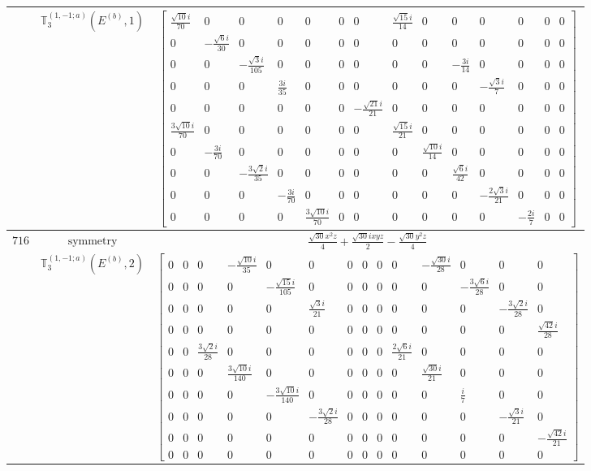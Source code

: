 \documentclass[fleqn,8pt,landscape]{jsarticle}
\begin{document}
\begin{longtable}{ccc}
$  $ & $ \mathbb{T}_{3}^{(1,-1;a)}(E^{(b)},1) $ & $ \begin{bmatrix} \frac{\sqrt{10} i}{70} & 0 & 0 & 0 & 0 & 0 & 0 & \frac{\sqrt{15} i}{14} & 0 & 0 & 0 & 0 & 0 & 0 \\ 0 & - \frac{\sqrt{6} i}{30} & 0 & 0 & 0 & 0 & 0 & 0 & 0 & 0 & 0 & 0 & 0 & 0 \\ 0 & 0 & - \frac{\sqrt{3} i}{105} & 0 & 0 & 0 & 0 & 0 & 0 & - \frac{3 i}{14} & 0 & 0 & 0 & 0 \\ 0 & 0 & 0 & \frac{3 i}{35} & 0 & 0 & 0 & 0 & 0 & 0 & - \frac{\sqrt{3} i}{7} & 0 & 0 & 0 \\ 0 & 0 & 0 & 0 & 0 & 0 & - \frac{\sqrt{21} i}{21} & 0 & 0 & 0 & 0 & 0 & 0 & 0 \\ \frac{3 \sqrt{10} i}{70} & 0 & 0 & 0 & 0 & 0 & 0 & \frac{\sqrt{15} i}{21} & 0 & 0 & 0 & 0 & 0 & 0 \\ 0 & - \frac{3 i}{70} & 0 & 0 & 0 & 0 & 0 & 0 & \frac{\sqrt{10} i}{14} & 0 & 0 & 0 & 0 & 0 \\ 0 & 0 & - \frac{3 \sqrt{2} i}{35} & 0 & 0 & 0 & 0 & 0 & 0 & \frac{\sqrt{6} i}{42} & 0 & 0 & 0 & 0 \\ 0 & 0 & 0 & - \frac{3 i}{70} & 0 & 0 & 0 & 0 & 0 & 0 & - \frac{2 \sqrt{3} i}{21} & 0 & 0 & 0 \\ 0 & 0 & 0 & 0 & \frac{3 \sqrt{10} i}{70} & 0 & 0 & 0 & 0 & 0 & 0 & - \frac{2 i}{7} & 0 & 0 \end{bmatrix} $ \\ \hline
$ 716 $ & $ \text{symmetry} $ & $ \frac{\sqrt{30} x^{2} z}{4} + \frac{\sqrt{30} i x y z}{2} - \frac{\sqrt{30} y^{2} z}{4} $ \\
$  $ & $ \mathbb{T}_{3}^{(1,-1;a)}(E^{(b)},2) $ & $ \begin{bmatrix} 0 & 0 & 0 & - \frac{\sqrt{10} i}{35} & 0 & 0 & 0 & 0 & 0 & 0 & - \frac{\sqrt{30} i}{28} & 0 & 0 & 0 \\ 0 & 0 & 0 & 0 & - \frac{\sqrt{15} i}{105} & 0 & 0 & 0 & 0 & 0 & 0 & - \frac{3 \sqrt{6} i}{28} & 0 & 0 \\ 0 & 0 & 0 & 0 & 0 & \frac{\sqrt{3} i}{21} & 0 & 0 & 0 & 0 & 0 & 0 & - \frac{3 \sqrt{2} i}{28} & 0 \\ 0 & 0 & 0 & 0 & 0 & 0 & 0 & 0 & 0 & 0 & 0 & 0 & 0 & \frac{\sqrt{42} i}{28} \\ 0 & 0 & \frac{3 \sqrt{2} i}{28} & 0 & 0 & 0 & 0 & 0 & 0 & \frac{2 \sqrt{6} i}{21} & 0 & 0 & 0 & 0 \\ 0 & 0 & 0 & \frac{3 \sqrt{10} i}{140} & 0 & 0 & 0 & 0 & 0 & 0 & \frac{\sqrt{30} i}{21} & 0 & 0 & 0 \\ 0 & 0 & 0 & 0 & - \frac{3 \sqrt{10} i}{140} & 0 & 0 & 0 & 0 & 0 & 0 & \frac{i}{7} & 0 & 0 \\ 0 & 0 & 0 & 0 & 0 & - \frac{3 \sqrt{2} i}{28} & 0 & 0 & 0 & 0 & 0 & 0 & - \frac{\sqrt{3} i}{21} & 0 \\ 0 & 0 & 0 & 0 & 0 & 0 & 0 & 0 & 0 & 0 & 0 & 0 & 0 & - \frac{\sqrt{42} i}{21} \\ 0 & 0 & 0 & 0 & 0 & 0 & 0 & 0 & 0 & 0 & 0 & 0 & 0 & 0 \end{bmatrix} $ \\ \hline

\end{longtable}
\end{document}
